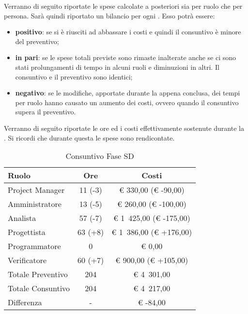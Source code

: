 	Verranno di seguito riportate le spese calcolate a posteriori sia per ruolo che per persona.
	Sarà quindi riportato un bilancio per ogni . Esso potrà essere:
	\begin{itemize}
		\item \textbf{positivo}: se si è riusciti ad abbassare i costi e quindi il consuntivo è minore del preventivo;
		\item \textbf{in pari}: se le spese totali previste sono rimaste inalterate anche se ci sono stati prolungamenti di tempo in alcuni ruoli e diminuzioni in altri. Il consuntivo e il preventivo sono identici;
		\item \textbf{negativo}: se le modifiche, apportate durante la  appena conclusa, dei tempi per ruolo hanno causato un aumento dei costi, ovvero quando il consuntivo supera il preventivo.
	\end{itemize}

			Verranno di seguito riportate le ore ed i costi effettivamente sostenute durante la . Si ricordi che durante questa  le spese sono rendicontate.
			\begin{table}[H]
				\begin{center}
					\begin{tabular}{| l | c | c |}
						\hline
						Ruolo 				& Ore 	& Costi  \\ \hline
						
						Project Manager		& 11 (-3) 		& \euro{} 330,00 (\euro{} -90,00)	\\
						Amministratore 		& 13 (-5)		& \euro{} 260,00 (\euro{} -100,00)	\\
						Analista	 		& 57 (-7)		& \euro{} 1~425,00 (\euro{} -175,00)	\\
						Progettista 		& 63 (+8)		& \euro{} 1~386,00  (\euro{} +176,00)	\\
						Programmatore		& 0				& \euro{} 0,00	\\
						Verificatore		& 60 (+7)		& \euro{} 900,00 (\euro{} +105,00)	\\ \hline \hline
							
						Totale Preventivo	& 204 			& \euro{} 4~301,00 	\\ \hline
						Totale Consuntivo	& 204 			& \euro{} 4~217,00 	\\ \hline
						Differenza			& - 			& \euro{} -84,00 	\\ \hline	
					\end{tabular}
				\end{center}
				\caption{Consuntivo Fase SD}
			\end{table}

